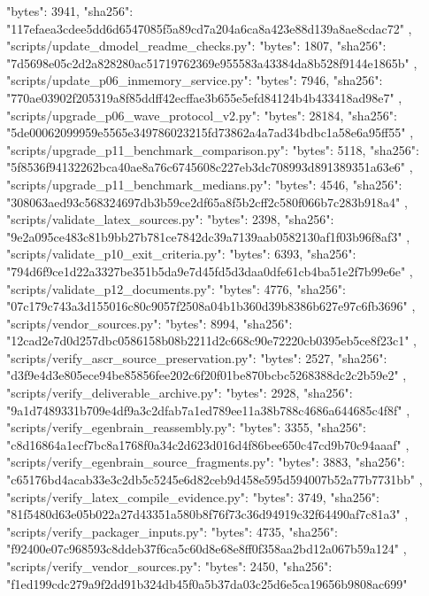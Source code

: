 {{{      "bytes": 3941,
      "sha256": "117efaea3cdee5dd6d6547085f5a89cd7a204a6ca8a423e88d139a8ae8cdac72"
    },
    "scripts/update_dmodel_readme_checks.py": {
      "bytes": 1807,
      "sha256": "7d5698e05c2d2a828280ac51719762369e955583a43384da8b528f9144e1865b"
    },
    "scripts/update_p06_inmemory_service.py": {
      "bytes": 7946,
      "sha256": "770ae03902f205319a8f85ddff42ecffae3b655e5efd84124b4b433418ad98e7"
    },
    "scripts/upgrade_p06_wave_protocol_v2.py": {
      "bytes": 28184,
      "sha256": "5de00062099959e5565e349786023215fd73862a4a7ad34bdbc1a58e6a95ff55"
    },
    "scripts/upgrade_p11_benchmark_comparison.py": {
      "bytes": 5118,
      "sha256": "5f8536f94132262bca40ae8a76c6745608c227eb3dc708993d891389351a63e6"
    },
    "scripts/upgrade_p11_benchmark_medians.py": {
      "bytes": 4546,
      "sha256": "308063aed93c568324697db3b59ce2df65a8f5b2cff2c580f066b7c283b918a4"
    },
    "scripts/validate_latex_sources.py": {
      "bytes": 2398,
      "sha256": "9e2a095ce483c81b9bb27b781ce7842dc39a7139aab0582130af1f03b96f8af3"
    },
    "scripts/validate_p10_exit_criteria.py": {
      "bytes": 6393,
      "sha256": "794d6f9ce1d22a3327be351b5da9e7d45fd5d3daa0dfe61cb4ba51e2f7b99e6e"
    },
    "scripts/validate_p12_documents.py": {
      "bytes": 4776,
      "sha256": "07c179c743a3d155016c80c9057f2508a04b1b360d39b8386b627e97c6fb3696"
    },
    "scripts/vendor_sources.py": {
      "bytes": 8994,
      "sha256": "12cad2e7d0d257dbc0586158b08b2211d2c668c90e72220cb0395eb5ce8f23c1"
    },
    "scripts/verify_ascr_source_preservation.py": {
      "bytes": 2527,
      "sha256": "d3f9e4d3e805ece94be85856fee202c6f20f01be870bcbc5268388dc2c2b59e2"
    },
    "scripts/verify_deliverable_archive.py": {
      "bytes": 2928,
      "sha256": "9a1d7489331b709e4df9a3c2dfab7a1ed789ee11a38b788c4686a644685c4f8f"
    },
    "scripts/verify_egenbrain_reassembly.py": {
      "bytes": 3355,
      "sha256": "c8d16864a1ecf7bc8a1768f0a34c2d623d016d4f86bee650c47cd9b70c94aaaf"
    },
    "scripts/verify_egenbrain_source_fragments.py": {
      "bytes": 3883,
      "sha256": "c65176bd4acab33e3c2db5c5245e6d82ceb9d458e595d594007b52a77b7731bb"
    },
    "scripts/verify_latex_compile_evidence.py": {
      "bytes": 3749,
      "sha256": "81f5480d63e05b022a27d43351a580b8f76f73c36d94919c32f64490af7c81a3"
    },
    "scripts/verify_packager_inputs.py": {
      "bytes": 4735,
      "sha256": "f92400e07c968593c8ddeb37f6ca5c60d8e68e8ff0f358aa2bd12a067b59a124"
    },
    "scripts/verify_vendor_sources.py": {
      "bytes": 2450,
      "sha256": "f1ed199cdc279a9f2dd91b324db45f0a5b37da03c25d6e5ca19656b9808ac699"
}}}
